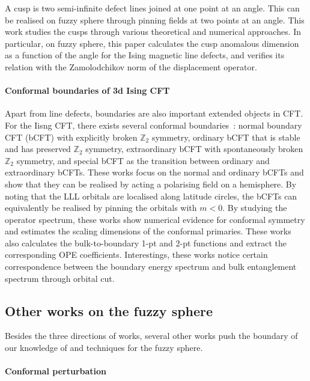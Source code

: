 \documentclass{timesjhep}
\begin{document}
A cusp is two semi-infinite defect lines joined at one point at an angle. This can be realised on fuzzy sphere through pinning fields at two points at an angle. This work studies the cusps through various theoretical and numerical approaches. In particular, on fuzzy sphere, this paper calculates the cusp anomalous dimension as a function of the angle for the Ising magnetic line defects, and verifies its relation with the Zamolodchikov norm of the displacement operator. 

\paragraph{Conformal boundaries of 3d Ising CFT~\cite{Zhou2024Jul,Dedushenko2024}}

Apart from line defects, boundaries are also important extended objects in CFT. For the Iisng CFT, there exists several conformal boundaries~: normal boundary CFT (bCFT) with explicitly broken $\mathbb{Z}_2$ symmetry, ordinary bCFT that is stable and has preserved $\mathbb{Z}_2$ symmetry, extraordinary bCFT with spontaneously broken $\mathbb{Z}_2$ symmetry, and special bCFT as the transition between ordinary and extraordinary bCFTs. These works focus on the normal and ordinary bCFTs and show that they can be realised by acting a polarising field on a hemisphere. By noting that the LLL orbitals are localised along latitude circles, the bCFTs can equivalently be realised by pinning the orbitals with $m<0$. By studying the operator spectrum, these works show numerical evidence for conformal symmetry and estimates the scaling dimensions of the conformal primaries. These works also calculates the bulk-to-boundary 1-pt and 2-pt functions and extract the corresponding OPE coefficients. Interestings, these works notice certain correspondence between the boundary energy spectrum and bulk entanglement spectrum through orbital cut. 

\subsection{Other works on the fuzzy sphere}

Besides the three directions of works, several other works push the boundary of our knowledge of and techniques for the fuzzy sphere. 

\paragraph{Conformal perturbation~\cite{Lao2023}}
\end{document}
